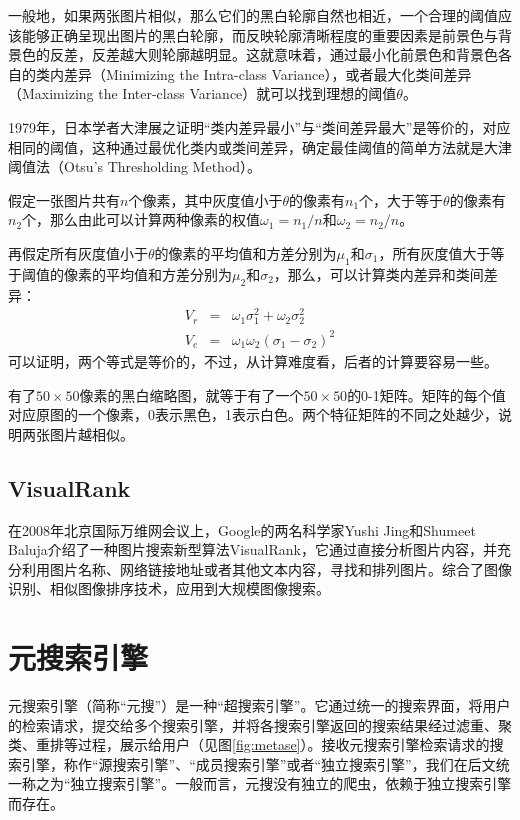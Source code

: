 一般地，如果两张图片相似，那么它们的黑白轮廓自然也相近，一个合理的阈值应该能够正确呈现出图片的黑白轮廓，而反映轮廓清晰程度的重要因素是前景色与背景色的反差，反差越大则轮廓越明显。这就意味着，通过最小化前景色和背景色各自的类内差异（Minimizing the Intra-class Variance），或者最大化类间差异（Maximizing the Inter-class Variance）就可以找到理想的阈值$\theta$。

1979年，日本学者大津展之证明“类内差异最小”与“类间差异最大”是等价的，对应相同的阈值，这种通过最优化类内或类间差异，确定最佳阈值的简单方法就是大津阈值法（Otsu's Thresholding Method）。

假定一张图片共有$n$个像素，其中灰度值小于$\theta$的像素有$n_1$个，大于等于$\theta$的像素有$n_2$个，那么由此可以计算两种像素的权值$\omega_1 = n_1/n$和$\omega_2=n_2/n$。

再假定所有灰度值小于$\theta$的像素的平均值和方差分别为$\mu_1$和$\sigma_1$，所有灰度值大于等于阈值的像素的平均值和方差分别为$\mu_2$和$\sigma_2$，那么，可以计算类内差异和类间差异：
\begin{eqnarray}
  V_r &=& \omega_1\sigma_1^2 + \omega_2\sigma_2^2 \\
  V_e &=& \omega_1\omega_2(\sigma_1 - \sigma_2)^2
\end{eqnarray}
可以证明，两个等式是等价的，不过，从计算难度看，后者的计算要容易一些。

有了$50\times 50$像素的黑白缩略图，就等于有了一个$50\times 50$的0-1矩阵。矩阵的每个值对应原图的一个像素，0表示黑色，1表示白色。两个特征矩阵的不同之处越少，说明两张图片越相似。

\subsection{VisualRank}
在2008年北京国际万维网会议上，Google的两名科学家Yushi Jing和Shumeet Baluja介绍了一种图片搜索新型算法VisualRank，它通过直接分析图片内容，并充分利用图片名称、网络链接地址或者其他文本内容，寻找和排列图片。综合了图像识别、相似图像排序技术，应用到大规模图像搜索\cite{jing2008visualrank}。

\section{元搜索引擎}
元搜索引擎（简称“元搜”）是一种“超搜索引擎”。它通过统一的搜索界面，将用户的检索请求，提交给多个搜索引擎，并将各搜索引擎返回的搜索结果经过滤重、聚类、重排等过程，展示给用户（见图\ref{fig:metase}）。接收元搜索引擎检索请求的搜索引擎，称作“源搜索引擎”、“成员搜索引擎”或者“独立搜索引擎”，我们在后文统一称之为“独立搜索引擎”。一般而言，元搜没有独立的爬虫，依赖于独立搜索引擎而存在。

